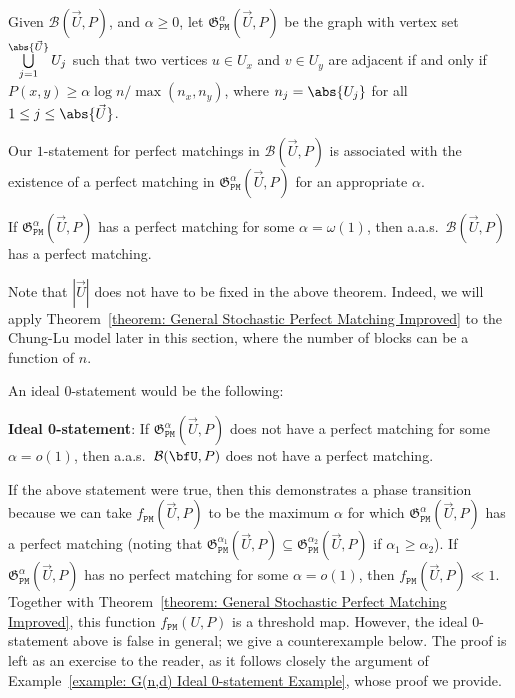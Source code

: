 \documentclass[12pt]{article}
\begin{document}
\begin{definition}
\label{defn: graph spectrum}
Given $\mathcal{B}(\vec{U},P)$, and  $\alpha\geq 0$, let $\mathfrak{G}_{\texttt{PM}}^\alpha(\vec{U}, P)$ be the graph with vertex set $\bigcup\limits_{j=1}^{\abs{\vec{U}}} U_j$ such that two vertices $u\in U_x$ and $v\in U_y$ are adjacent if and only if $P(x,y)\geq \alpha\log n/\max(n_x, n_y)$, where $n_j= \abs{U_j}$ for all $1\leq j\leq\abs{\vec{U}}$. 
\end{definition}

Our $1$-statement for perfect matchings in $\mathcal{B}(\vec{U},P)$ is associated with the existence of a perfect matching in $\mathfrak{G}_{\texttt{PM}}^\alpha(\vec{U}, P)$ for an appropriate $\alpha$.

\begin{theorem}
\label{theorem: General Stochastic Perfect Matching Improved}
If $\mathfrak{G}_{\texttt{PM}}^{\alpha} (\vec{U}, P)$ has a perfect matching for some $\alpha = \omega(1)$, then a.a.s.\  $\mathcal{B}(\vec{U},P)$ has a perfect matching. 
\end{theorem}

Note that $|\vec{U}|$ does not have to be fixed in the above theorem. Indeed, we will apply Theorem~\ref{theorem: General Stochastic Perfect Matching Improved} to the Chung-Lu model later in this section, where the number of blocks can be a function of $n$.

An ideal $0$-statement would be the following:

\begin{mdframed}[backgroundcolor=gray!30]
\textbf{Ideal 0-statement}: If  $\mathfrak{G}_{\texttt{PM}}^\alpha (\vec{U}, P)$ does not have a perfect matching for some $\alpha = o(1)$, then a.a.s.\ $\mathcal{B}(\bfU,P)$ does not have a perfect matching.
\end{mdframed}

If the above statement were true, then this demonstrates a phase transition because we can take $f_{\texttt{PM}}(\vec{U}, P)$ to be the maximum $\alpha$ for which $\mathfrak{G}_{\texttt{PM}}^{\alpha}(\vec{U}, P)$ has a perfect matching (noting that $\mathfrak{G}_{\texttt{PM}}^{\alpha_1}(\vec{U},P)\subseteq\mathfrak{G}_{\texttt{PM}}^{\alpha_2}(\vec{U},P)$ if $\alpha_1\geq\alpha_2$). If $\mathfrak{G}_{\texttt{PM}}^{\alpha}(\vec{U},P)$ has no perfect matching for some $\alpha = o(1)$, then $f_{\texttt{PM}}(\vec{U}, P)\ll 1$. Together with Theorem~\ref{theorem: General Stochastic Perfect Matching Improved}, this function $f_{\texttt{PM}}(U, P)$ is a threshold map. However, the ideal 0-statement above is false in general; we give a counterexample below. The proof is left as an exercise to the reader, as it follows closely the argument of Example~\ref{example: G(n,d) Ideal 0-statement Example}, whose proof we provide. 
\end{document}

